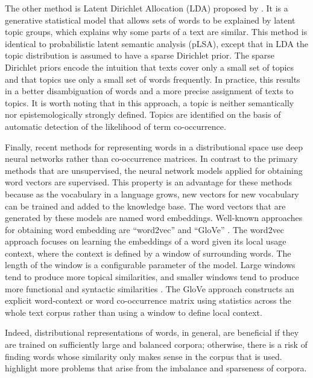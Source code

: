 The other method is Latent Dirichlet Allocation (LDA) proposed by . 
It is a generative statistical model that allows sets of words to be explained by latent topic groups,  which explains why some parts of a text are similar. 
This method is identical to probabilistic latent semantic analysis (pLSA), except that in LDA the topic distribution is assumed to have a sparse Dirichlet prior.
The sparse Dirichlet priors encode the intuition that texts cover only a small set of topics and that topics use only a small set of words frequently. 
In practice, this results in a better disambiguation of words and a more precise assignment of texts to topics.
It is worth noting that in this approach, a topic is neither semantically nor epistemologically strongly defined. 
Topics are identified on the basis of automatic detection of the likelihood of term co-occurrence. 

Finally, recent methods for representing words in a distributional space use deep neural networks rather than co-occurrence matrices. 
In contrast to the primary methods that are unsupervised, the neural network models applied for obtaining word vectors are supervised.  
This property is an advantage for these methods because as the vocabulary in a language grows, new vectors for new vocabulary can be trained and added to the knowledge base. 
The word vectors that are generated by these models are named word embeddings. 
Well-known approaches for obtaining word embedding are ``word2vec''  \cite{mikolov13} and ``GloVe'' \cite{pennington14}. 
The word2vec approach focuses on learning the embeddings of a word given its local usage context, where the context is defined by a window of surrounding words. 
The length of the window is a configurable parameter of the model. 
Large windows tend to produce more topical similarities, and smaller windows tend to produce more functional and syntactic similarities \cite{goldberg17}. 
The GloVe approach constructs an explicit word-context or word co-occurrence matrix using statistics across the whole text corpus rather than using a window to define local context. 

Indeed, distributional representations of words, in general, are beneficial if they are trained on sufficiently large and balanced corpora; otherwise, there is a risk \cite{lindekang98b} of finding words whose similarity only makes sense in the corpus that is used. 
 highlight more problems that arise from the imbalance and sparseness of corpora.

